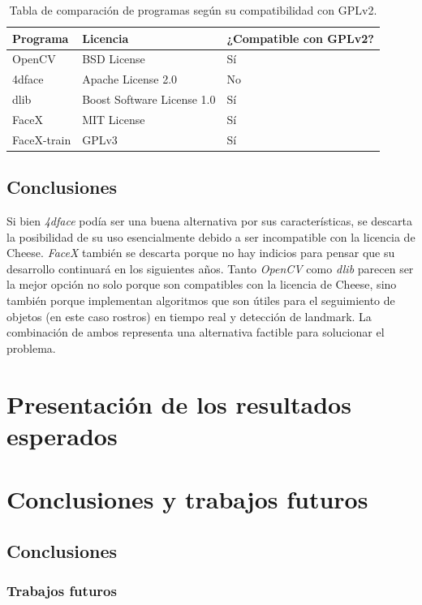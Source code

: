 \documentclass[a4paper,openright,12pt]{report}
\begin{document}
\begin{center}
	\begin{table}[h]
  \begin{tabular}{| l | l | l |}
  \hline
  Programa & Licencia & ¿Compatible con GPLv2? \\ \hline
  OpenCV & BSD License & Sí \\ \hline
  4dface & Apache License 2.0 & No \\ \hline
  dlib & Boost Software License 1.0 & Sí \\ \hline
  FaceX & MIT License & Sí \\ \hline
  FaceX-train & GPLv3 & Sí \\ \hline
  \end{tabular}
  \caption{Tabla de comparación de programas según su compatibilidad con GPLv2.}
	\end{table}
\end{center}


\section{Conclusiones}
Si bien \textit{4dface} podía ser una buena alternativa por sus características,
se descarta la posibilidad de su uso esencialmente debido a ser incompatible
con la licencia de Cheese. \textit{FaceX} también se descarta porque no hay
indicios para pensar que su desarrollo continuará en los siguientes años. Tanto
\textit{OpenCV} como \textit{dlib} parecen ser la mejor opción no solo porque
son compatibles con la licencia de Cheese, sino también porque implementan
algoritmos que son útiles para el seguimiento de objetos (en este caso rostros)
en tiempo real y detección de landmark. La combinación de ambos representa una
alternativa factible para solucionar el problema.

\chapter{Presentación de los resultados esperados}
\chapter{Conclusiones y trabajos futuros}
\section{Conclusiones}
\subsection{Trabajos futuros}


{}
\end{document}
